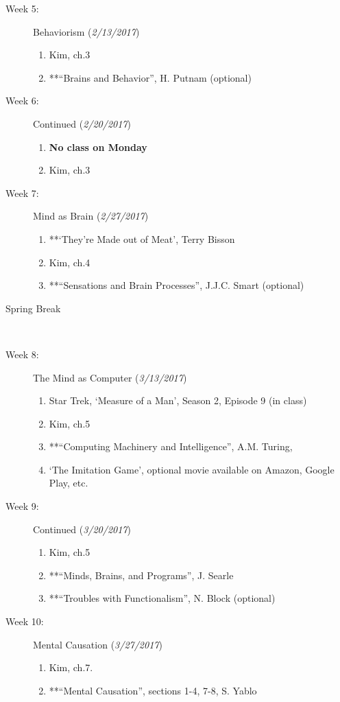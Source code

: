 \documentclass[article,oneside]{memoir}
\begin{document}
\begin{description}
\item[Week 5: ] Behaviorism  (\emph{2/13/2017})
\begin{enumerate}
\item Kim, ch.3
\item **``Brains and Behavior'', H. Putnam (optional)
 \end{enumerate}
 
\item[Week 6:] Continued  (\emph{2/20/2017})
\begin{enumerate}
\item \textbf{No class on Monday}
\item Kim, ch.3
\end{enumerate}

\item[Week 7:] Mind as Brain (\emph{2/27/2017})
\begin{enumerate}
\item **`They're Made out of Meat', Terry Bisson
\item Kim, ch.4
\item **``Sensations and Brain Processes'', J.J.C. Smart (optional)
\end{enumerate}

\item[Spring Break]\


\item[Week 8:] The Mind as Computer (\emph{3/13/2017})
\begin{enumerate}
\item Star Trek, ‘Measure of a Man’, Season 2, Episode 9 (in class)
\item Kim, ch.5
\item **``Computing Machinery and Intelligence'', A.M. Turing, 
\item `The Imitation Game', optional movie available on Amazon, Google Play, etc. \end{enumerate}

\item[Week 9:] Continued  (\emph{3/20/2017})
\begin{enumerate}
\item Kim, ch.5
\item**``Minds, Brains, and Programs'', J.  Searle
\item **``Troubles with Functionalism'', N. Block (optional)
\end{enumerate}


\item[Week 10:] Mental Causation (\emph{3/27/2017})
\begin{enumerate}
\item Kim, ch.7. 
\item **``Mental Causation'', sections 1-4, 7-8, S. Yablo
\end{enumerate}


\end{description}
\end{document}
